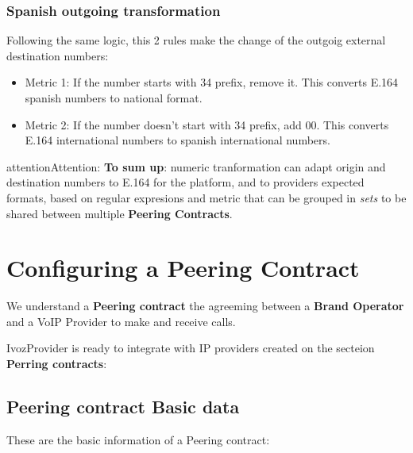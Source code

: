 \documentclass[letterpaper,10pt,english]{sphinxmanual}
\begin{document}
\subsubsection{Spanish outgoing transformation}
\label{external_incoming_calls/numeric_transformations:spanish-outgoing-transformation}
\noindent{}

Following the same logic, this 2 rules make the change of the outgoig external
destination numbers:
\begin{itemize}
\item {} 
Metric 1: If the number starts with 34 prefix, remove it. This converts
E.164 spanish numbers to national format.

\item {} 
Metric 2: If the number doesn't start with 34 prefix, add 00. This converts
E.164 international numbers to spanish international numbers.

\end{itemize}

\begin{notice}{attention}{Attention:}
\textbf{To sum up}: numeric tranformation can adapt origin and
destination numbers to E.164 for the platform, and to providers expected
formats, based on regular expresions and metric that can be grouped in \emph{sets}
to be shared between multiple \textbf{Peering Contracts}.
\end{notice}


\section{Configuring a Peering Contract}
\label{external_incoming_calls/peering_contracts:configuring-a-peering-contract}\label{external_incoming_calls/peering_contracts::doc}\label{external_incoming_calls/peering_contracts:peering-contracts}
We understand a \textbf{Peering contract} the agreeming between a \textbf{Brand Operator}
and a VoIP Provider to make and receive calls.

IvozProvider is ready to integrate with IP providers created on the secteion
\textbf{Perring contracts}:



\subsection{Peering contract Basic data}
\label{external_incoming_calls/peering_contracts:peering-contract-basic-data}
These are the basic information of a Peering contract:
\end{document}
